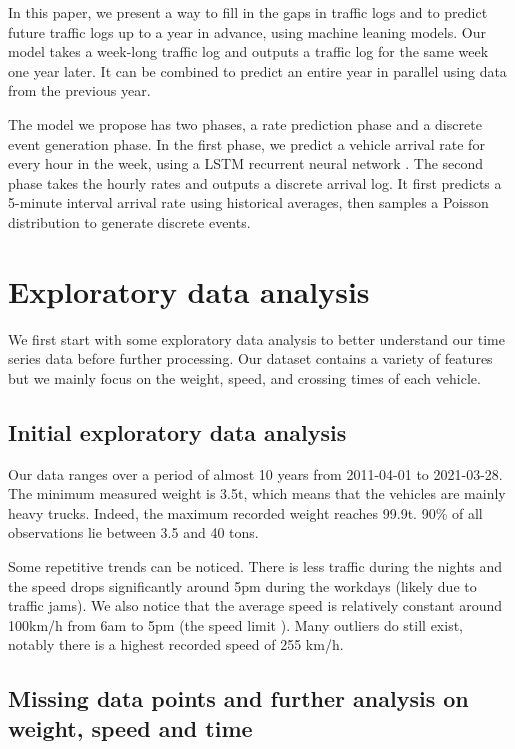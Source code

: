\documentclass[10pt,conference,compsocconf]{IEEEtran}
\begin{document}
In this paper, we present a way to fill in the gaps in traffic logs and to predict future traffic 
logs up to a year in advance, using machine leaning models. Our model takes a week-long traffic
log and outputs a traffic log for the same week one year later. It can be combined to predict an 
entire year in parallel using data from the previous year. 

The model we propose has two phases, a rate prediction phase and a discrete event generation phase.
In the first phase, we predict a vehicle arrival rate for every hour in the week, using a LSTM 
recurrent neural network \cite{LSTM}. The second phase takes the hourly rates and outputs a discrete 
arrival log. It first predicts a 5-minute interval arrival rate using historical averages, then samples
a Poisson distribution to generate discrete events.


\section{Exploratory data analysis}

We first start with some exploratory data analysis to better understand our time series data before further processing. Our dataset contains a variety of features but we mainly focus on the weight, speed, and crossing times of each vehicle. 

\subsection{Initial exploratory data analysis}

Our data ranges over a period of almost 10 years from 2011-04-01 to 2021-03-28. The minimum measured weight is 3.5t, which means that the vehicles are mainly heavy trucks. Indeed, the maximum recorded weight reaches 99.9t. 90\% of all observations lie between 3.5 and 40 tons.

Some repetitive trends can be noticed. There is less traffic during the nights and the speed drops significantly around 5pm during the workdays (likely due to traffic jams). We also notice that the average speed is relatively constant around 100km/h from 6am to 5pm (the speed limit \cite{road_rule}). Many outliers do still exist, notably there is a highest recorded speed of 255 km/h.

\subsection{Missing data points and further analysis on weight, speed and time}
\end{document}
